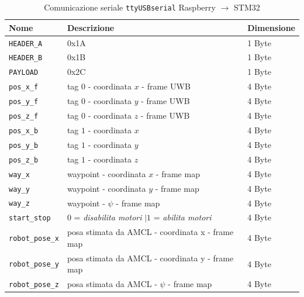 \begin{table}[h]
		\centering
		
		\begin{tabular}{lll}
			Nome                 & Descrizione                                & Dimensione\\
			\hline
			\verb!HEADER_A!      & 0x1A                                       & 1 Byte\\
			\verb!HEADER_B!      & 0x1B                                       & 1 Byte\\
			\verb!PAYLOAD!       & 0x2C                                       & 1 Byte\\
			\hline
			\verb!pos_x_f!       & tag $0$ - coordinata $x$ - frame UWB       & 4 Byte\\
			\verb!pos_y_f!       & tag $0$ - coordinata $y$ - frame UWB       & 4 Byte\\
			\verb!pos_z_f!       & tag $0$ - coordinata $z$ - frame UWB       & 4 Byte\\
			\hline
			\verb!pos_x_b!       & tag $1$ - coordinata $x$                   & 4 Byte\\
			\verb!pos_y_b!       & tag $1$ - coordinata $y$                   & 4 Byte\\
			\verb!pos_z_b!       & tag $1$ - coordinata $z$                   & 4 Byte\\
			\hline
			\verb!way_x!         & waypoint - coordinata $x$ - frame map    & 4 Byte\\
			\verb!way_y!         & waypoint - coordinata $y$ - frame map    & 4 Byte\\
			\verb!way_z!         & waypoint - $\psi$  - frame map            & 4 Byte\\
			\hline
			\verb!start_stop!    & $0$ = \textit{disabilita motori} $| 1$ =\textit{ abilita motori }      & 4 Byte\\
			\hline
			\verb!robot_pose_x!  & posa stimata da AMCL - coordinata x - frame map   & 4 Byte\\
			\verb!robot_pose_y!  & posa stimata da AMCL - coordinata y - frame map   & 4 Byte\\
			\verb!robot_pose_z!  & posa stimata da AMCL - $\psi$ - frame map            & 4 Byte\\
		\end{tabular}
		\caption{Comunicazione seriale \texttt{ttyUSBserial} Raspberry $\rightarrow$ STM32}
		\label{tab: comunicazione_seriale2stm}
\end{table}



